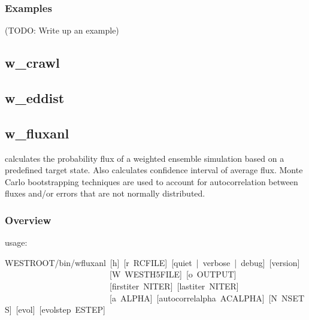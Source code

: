 \documentclass[letterpaper,10pt,english]{sphinxmanual}
\begin{document}
\subsubsection{Examples}
\label{\detokenize{users_guide/command_line_tools/w_bins:examples}}
(TODO: Write up an example)


\subsection{w\_crawl}
\label{\detokenize{users_guide/command_line_tools/w_crawl:w-crawl}}\label{\detokenize{users_guide/command_line_tools/w_crawl:id1}}\label{\detokenize{users_guide/command_line_tools/w_crawl::doc}}

\subsection{w\_eddist}
\label{\detokenize{users_guide/command_line_tools/w_eddist:w-eddist}}\label{\detokenize{users_guide/command_line_tools/w_eddist:id1}}\label{\detokenize{users_guide/command_line_tools/w_eddist::doc}}

\subsection{w\_fluxanl}
\label{\detokenize{users_guide/command_line_tools/w_fluxanl:w-fluxanl}}\label{\detokenize{users_guide/command_line_tools/w_fluxanl:id1}}\label{\detokenize{users_guide/command_line_tools/w_fluxanl::doc}}
 calculates the probability flux of a weighted ensemble simulation
based on a pre\sphinxhyphen{}defined target state. Also calculates confidence interval of
average flux. Monte Carlo bootstrapping techniques are used to account for
autocorrelation between fluxes and/or errors that are not normally distributed.


\subsubsection{Overview}
\label{\detokenize{users_guide/command_line_tools/w_fluxanl:overview}}
usage:

\begin{sphinxVerbatim}[commandchars=\\\{\}]
\PYGZdl{}WEST\PYGZus{}ROOT/bin/w\PYGZus{}fluxanl [\PYGZhy{}h] [\PYGZhy{}r RCFILE] [\PYGZhy{}\PYGZhy{}quiet | \PYGZhy{}\PYGZhy{}verbose | \PYGZhy{}\PYGZhy{}debug] [\PYGZhy{}\PYGZhy{}version]
                         [\PYGZhy{}W WEST\PYGZus{}H5FILE] [\PYGZhy{}o OUTPUT]
                         [\PYGZhy{}\PYGZhy{}first\PYGZhy{}iter N\PYGZus{}ITER] [\PYGZhy{}\PYGZhy{}last\PYGZhy{}iter N\PYGZus{}ITER]
                         [\PYGZhy{}a ALPHA] [\PYGZhy{}\PYGZhy{}autocorrel\PYGZhy{}alpha ACALPHA] [\PYGZhy{}N NSETS] [\PYGZhy{}\PYGZhy{}evol] [\PYGZhy{}\PYGZhy{}evol\PYGZhy{}step ESTEP]
\end{sphinxVerbatim}
\end{document}

